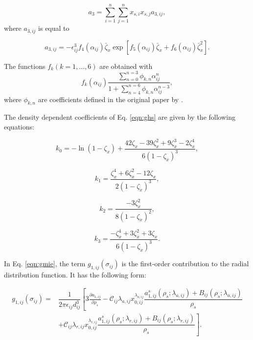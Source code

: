 \begin{equation}
a_{3} = \sum_{i=1}^{n} \sum_{j=1}^{n} x_{s,i} x_{s,j} a_{3,ij},
\end{equation}	
where $a_{3,ij}$ is equal to

\begin{equation}
a_{3,ij} = - \epsilon _{ij}^{3} f_{4}(\alpha_{ij}) \bar{\zeta}_{x} \exp[f_{5}(\alpha_{ij}) \bar{\zeta}_{x}+ f_{6}(\alpha_{ij}) \bar{\zeta}_{x}^{2}].
\end{equation}

The functions $f_{k}(k=1,...,6)$ are obtained with
\begin{equation}
f_{k}(\alpha_{ij}) \dfrac{\sum_{n=0}^{n=3} \phi_{k,n} \alpha_{ij}^{n}}{1+ \sum_{n=4}^{n=6} \phi_{k,n} \alpha_{ij}^{n-3}},
\end{equation}
where $\phi_{k,n}$ are coefficients defined in the original paper by .

The density dependent coefficients of Eq. \ref{eqn:ghs} are given by the following equations:

\begin{equation}
k_{0} = - \ln(1-{\zeta}_{x}) + \frac{42{\zeta}_{x} -39{\zeta}_{x}^{2}+ 9{\zeta}_{x}^{3}-2{\zeta}_{x}^{4}}{6(1-\zeta_{x})^{3}},
\end{equation}

\begin{equation}
k_{1} = \frac{{\zeta}_{x}^{4} +6{\zeta}_{x}^{2}- 12{\zeta}_{x}}{2(1-\zeta_{x})^{3}},
\end{equation}

\begin{equation}
k_{2} = \frac{-3{\zeta}_{x}^{2}}{8(1-\zeta_{x})^{2}},
\end{equation}

\begin{equation}
k_{3} = \frac{-{\zeta}_{x}^{4}+3{\zeta}_{x}^{2}+3{\zeta}_{x}}{6(1-\zeta_{x})^{3}}.
\end{equation}

In Eq. \ref{eqn:gmie}, the term $g_{1,ij}(\sigma_{ij})$ is the first-order contribution to the radial distribution function. It has the following form:

\begin{equation}
\begin{aligned}
g_{1,ij}(\sigma_{ij}) {}=& \dfrac{1}{2 \pi \epsilon_{ij} d _{ij}^{3}} \left[ 3 \frac{\partial a_{1,ij}}{\partial \rho _{s}}   - \mathcal{C}_{ij} \lambda_{a,ij} x_{0,ij}^{\lambda_{a,ij}} \dfrac{a_{1,ij}^{s}(\rho_{s};\lambda_{a,ij})+B_{ij}(\rho_{s};\lambda_{a,ij})}{\rho _{s}} \right. \\
& \left.  + \mathcal{C}_{ij} \lambda_{r,ij} x_{0,ij}^{\lambda_{r,ij}} \dfrac{a_{1,ij}^{s}(\rho_{s};\lambda_{r,ij})+B_{ij}(\rho_{s};\lambda_{r,ij})}{\rho _{s}} \right].
\end{aligned}
\end{equation} 

